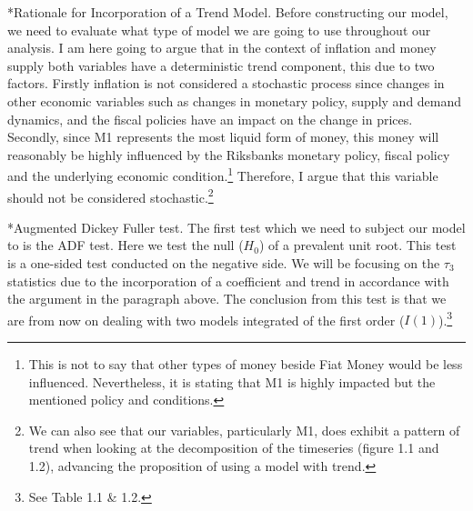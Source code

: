 \documentclass{article}
\makeatletter
\renewcommand{\paragraph}{\@startsection{paragraph}{4}{\z@}{3.25ex \@plus 1ex \@minus .2ex}{-1em}{\color{mydarkblue}\normalfont\small\bfseries}}
\makeatother
\begin{document}
        \paragraph*{Rationale for Incorporation of a Trend Model.}
        Before constructing our model, we need to evaluate what type of model we are going 
        to use throughout our analysis. I am here going to argue that in the context of inflation and money 
        supply both variables have a deterministic trend component, this due to two factors. Firstly inflation
        is not considered a stochastic process since changes in other economic variables such as changes
        in monetary policy, supply and demand dynamics, and the fiscal policies have an impact on the change in 
        prices. Secondly, since M1 represents the most liquid form of money, this money will reasonably be 
        highly influenced by the Riksbanks monetary policy, fiscal policy and the underlying economic 
        condition.\footnote
        {
        This is not to say that other types of money beside Fiat Money would be less influenced. 
        Nevertheless, it is stating that M1 is highly impacted but the mentioned policy and conditions.
        }
        Therefore, I argue that this variable should not be considered stochastic.\footnote{We can also see
        that our variables, particularly M1, does exhibit a pattern of trend when looking at the decomposition
        of the timeseries (figure 1.1 and 1.2), advancing the proposition of using a model with trend.}

        \paragraph*{Augmented Dickey Fuller test.} The first test which we need to subject our model to 
        is the ADF test. Here we test the null ($H_0$) of a prevalent unit root. This test is a one-sided 
        test conducted on the negative side. We will be focusing on the $\tau_3$ statistics due to the
        incorporation of a coefficient and trend in accordance with the argument in the paragraph above.
        The conclusion from this test is that we are from now on dealing with two models integrated of the 
        first order ($I(1)$).\footnote{See Table 1.1 \& 1.2.}
        
\end{document}
